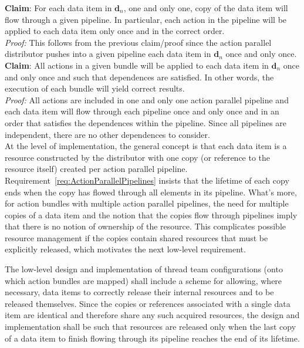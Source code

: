 \documentclass{article}
\begin{document}
\textbf{Claim}: For each data item in $\mathbf{d}_n$, one and only one, copy of the data
item will flow through a given pipeline.  In particular, each action in the
pipeline will be applied to each data item only once and in the correct
order.\\[0.05in]
\textit{Proof:}\hspace{0.125in} This follows from the previous
claim/proof since the action parallel distributor pushes into a given pipeline
each data item in $\mathbf{d}_n$ once and only once.\\

\textbf{Claim}: All actions in a given bundle will be applied to each data item in
$\mathbf{d}_n$ once and only once and such that dependences are satisfied.  In
other words, the execution of each bundle will yield correct results.\\[0.05in]
\textit{Proof:}\hspace{0.125in}  All actions are included in one and only one
action parallel pipeline and each data item will flow through each pipeline once
and only once and in an order that satisfies the dependences within the
pipeline.  Since all pipelines are independent, there are no other dependences
to consider.\\

At the level of implementation, the general concept is that each data item is a
resource constructed by the distributor with one copy (or reference to the
resource itself) created per action parallel pipeline.
Requirement~\ref{req:ActionParallelPipelines} insists that the lifetime of each
copy ends when the copy has flowed through all elements in its pipeline.  What's
more, for action bundles with multiple action parallel pipelines, the need for
multiple copies of a data item and the notion that the copies flow through
pipelines imply that there is no notion of ownership of the resource.  This
complicates possible resource management if the copies contain shared resources
that must be explicitly released, which motivates the next low-level
requirement.

\begin{req}
The low-level design and implementation of thread team configurations (onto
which action bundles are mapped) shall include a scheme for allowing, where
necessary, data items to correctly release their internal resources and to be
released themselves.  Since the copies or references associated with a single
data item are identical and therefore share any such acquired resources, the
design and implementation shall be such that resources are released only when
the last copy of a data item to finish flowing through its pipeline reaches the
end of its lifetime.
\end{req}
\end{document}
